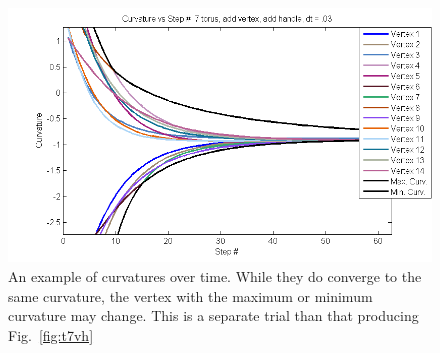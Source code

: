 \documentclass[12pt]{article}
\begin{document}
\begin{figure}
\begin{center}
\includegraphics[scale = 0.8]{Pictures/curvcurves.png}
\caption{An example of curvatures over time. While they do converge to the same curvature, the vertex with the maximum or minimum curvature may change. This is a separate trial than that producing Fig.~\ref{fig:t7vh}}
\end{center}
\end{figure}
\end{document}
